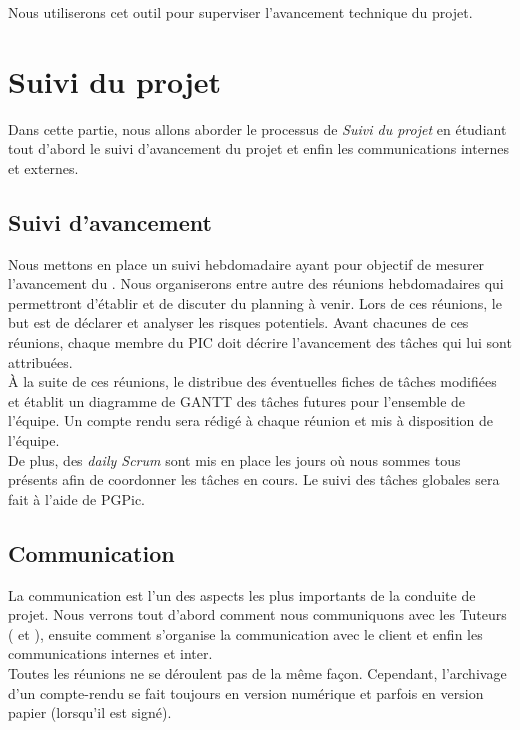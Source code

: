 Nous utiliserons cet outil pour superviser l'avancement technique du projet.

\section{Suivi du projet} 
\label{suivi_projet}

Dans cette partie, nous allons aborder le processus de \textit{Suivi du projet} en étudiant tout d'abord le suivi d'avancement du projet et enfin les communications internes et externes.  

\subsection{Suivi d'avancement}
\label{suivi_avancement}

Nous mettons en place un suivi hebdomadaire ayant pour objectif de mesurer l'avancement du \PICCourt. Nous organiserons entre autre des réunions hebdomadaires qui permettront d'établir et de discuter du planning à venir. Lors de ces réunions, le but est de déclarer et analyser les risques potentiels. Avant chacunes de ces réunions, chaque membre du PIC doit décrire l'avancement des tâches qui lui sont attribuées.\\

À la suite de ces réunions, le \CP{} distribue des éventuelles fiches de tâches modifiées et établit un diagramme de GANTT des tâches futures pour l'ensemble de l'équipe. Un compte rendu sera rédigé à chaque réunion et mis à disposition de l'équipe. \\

De plus, des \textit{daily Scrum} sont mis en place les jours où nous sommes tous présents afin de coordonner les tâches en cours. Le suivi des tâches globales sera fait à l’aide de PGPic.

\subsection{Communication}
\label{communication}

La communication est l'un des aspects les plus importants de la conduite de projet. Nous verrons tout d'abord comment nous communiquons avec les Tuteurs (\tuteurPedagogique{} et \tuteurQualite), ensuite comment s'organise la communication avec le client et enfin les communications internes et inter\PICCourt.\\ 

Toutes les réunions ne se déroulent pas de la même façon. Cependant, l’archivage d’un compte-rendu se fait toujours en version numérique et parfois en version papier (lorsqu’il est signé).

